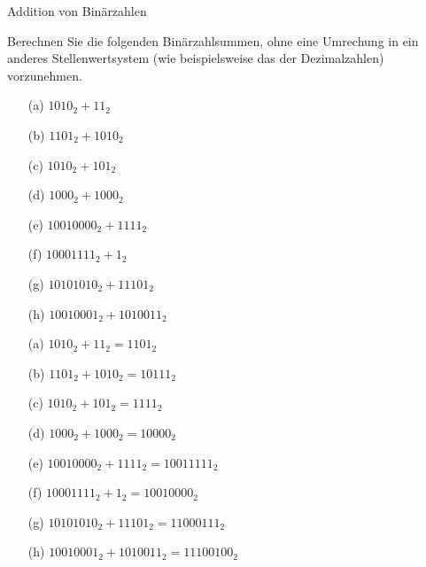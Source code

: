 \begin{frame}[t]%
\medskip

\begin{exercise}{Addition von Binärzahlen}
\begin{body}
\medskip

Berechnen Sie die folgenden Binärzahlsummen, ohne eine Umrechung in ein anderes Stellenwertsystem (wie beispielsweise das der Dezimalzahlen) vorzunehmen.
\begin{center}
\begin{minipage}{0.45\textwidth}
\begin{itemize}
\item[(a)] $1010_2 +   11_2$
\item[(b)] $1101_2 + 1010_2$
\item[(c)] $1010_2 +  101_2$
\item[(d)] $1000_2 + 1000_2$
\end{itemize}
\end{minipage}
\begin{minipage}{0.45\textwidth}
\begin{itemize}
\item[(e)] $10010000_2 + 1111_2$
\item[(f)] $10001111_2 + 1_2$
\item[(g)] $10101010_2 + 11101_2$
\item[(h)] $10010001_2 + 1010011_2$
\end{itemize}
\end{minipage}
\end{center}
\end{body}

\begin{solution}
\begin{center}
\begin{minipage}{0.45\textwidth}
\begin{itemize}
\item[(a)] $1010_2 +   11_2 = 1101_2$
\item[(b)] $1101_2 + 1010_2 = 10111_2$
\item[(c)] $1010_2 +  101_2 = 1111_2$
\item[(d)] $1000_2 + 1000_2 = 10000_2$
\end{itemize}
\end{minipage}
\begin{minipage}{0.45\textwidth}
\begin{itemize}
\item[(e)] $10010000_2 + 1111_2 = 10011111_2$
\item[(f)] $10001111_2 + 1_2 = 10010000_2$
\item[(g)] $10101010_2 + 11101_2 = 11000111_2$
\item[(h)] $10010001_2 + 1010011_2 = 11100100_2$
\end{itemize}
\end{minipage}
\end{center}
\end{solution}

\end{exercise}
\end{frame}
